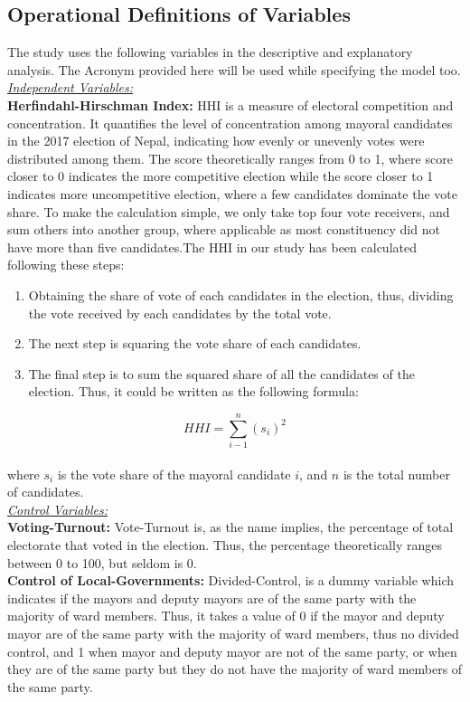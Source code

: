 \subsection{Operational Definitions of Variables}
The study uses the following variables in the descriptive and explanatory analysis. The Acronym provided here will be used while specifying the model too.\\
\textit{\underline{Independent Variables:}}\\
\textbf{Herfindahl-Hirschman Index:} HHI is a measure of electoral competition and concentration. It quantifies the level of concentration among mayoral candidates in the 2017 election of Nepal, indicating how evenly or unevenly votes were distributed among them. The score theoretically ranges from 0 to 1, where score closer to 0 indicates the more competitive election while the score closer to 1 indicates more uncompetitive election, where a few candidates dominate the vote share. To make the calculation simple, we only take top four vote receivers, and sum others into another group, where applicable as most constituency did not have more than five candidates.The HHI in our study has been calculated following these steps:\\
\begin{enumerate}[label=\roman*.]  
     \item Obtaining the share of vote of each candidates in the election, thus, dividing the vote received by each candidates by the total vote.
    \item The next step is squaring the vote share of each candidates.
    \item The final step is to sum the squared share of all the candidates of the election. Thus, it could be written as the following formula:
\end{enumerate}
\[HHI =\sum_{i-1}^{n}(s_i)^2\]\\ 
where \(s_i \) is the vote share of the mayoral candidate \( i \), and \( n \) is the total number of candidates.\\
\textit{\underline{Control Variables:}}\\
\textbf{Voting-Turnout:} Vote-Turnout is, as the name implies, the percentage of total electorate that voted in the election. Thus, the percentage theoretically ranges between 0 to 100, but seldom is 0. \\
\textbf{Control of Local-Governments:} Divided-Control, is a dummy variable which indicates if the mayors and deputy mayors are of the same party with the majority of ward members. Thus, it takes a value of 0 if the mayor and deputy mayor are of the same party with the majority of ward members, thus no divided control, and 1 when mayor and deputy mayor are not of the same party, or when they are of the same party but they do not have the majority of ward members of the same party.\\
